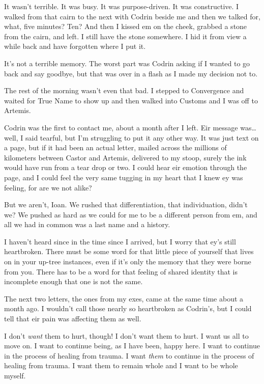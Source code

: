 It wasn't terrible. It was busy. It was purpose-driven. It was constructive. I walked from that cairn to the next with Codrin beside me and then we talked for, what, five minutes? Ten? And then I kissed em on the cheek, grabbed a stone from the cairn, and left. I still have the stone somewhere. I hid it from view a while back and have forgotten where I put it.

It's not a terrible memory. The worst part was Codrin asking if I wanted to go back and say goodbye, but that was over in a flash as I made my decision not to.

The rest of the morning wasn't even that bad. I stepped to Convergence and waited for True Name to show up and then walked into Customs and I was off to Artemis.

Codrin was the first to contact me, about a month after I left. Eir message was\ldots{}well, I said tearful, but I'm struggling to put it any other way. It was just text on a page, but if it had been an actual letter, mailed across the millions of kilometers between Castor and Artemis, delivered to my stoop, surely the ink would have run from a tear drop or two. I could hear eir emotion through the page, and I could feel the very same tugging in my heart that I knew ey was feeling, for are we not alike?

But we aren't, Ioan. We rushed that differentiation, that individuation, didn't we? We pushed as hard as we could for me to be a different person from em, and all we had in common was a last name and a history.

I haven't heard since in the time since I arrived, but I worry that ey's still heartbroken. There must be some word for that little piece of yourself that lives on in your up-tree instances, even if it's only the memory that they were borne from you. There has to be a word for that feeling of shared identity that is incomplete enough that one is not the same.

The next two letters, the ones from my exes, came at the same time about a month ago. I wouldn't call those nearly so heartbroken as Codrin's, but I could tell that eir pain was affecting them as well.

I don't \emph{want} them to hurt, though! I don't want them to hurt. I want us all to move on. I want to continue being, as I have been, happy here. I want to continue in the process of healing from trauma. I want \emph{them} to continue in the process of healing from trauma. I want them to remain whole and I want to be whole myself.

